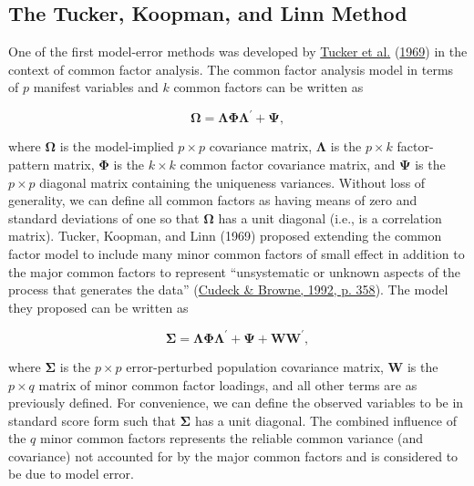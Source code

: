 \documentclass[11pt]{umnthesis}
\begin{document}
\hypertarget{tkl-method}{%
\subsection{The Tucker, Koopman, and Linn Method}\label{tkl-method}}

One of the first model-error methods was developed by \protect\hyperlink{ref-tucker1969}{Tucker et al.} (\protect\hyperlink{ref-tucker1969}{1969}) in the context of common factor analysis. The common factor analysis model in terms of \(p\) manifest variables and \(k\) common factors can be written as

\begin{equation}
\bm{\Omega} = \bm{\Lambda}\bm{\Phi}\bm{\Lambda}^\prime + \bm{\Psi},
\label{eq:cfm}
\end{equation}

\noindent where \(\bm{\Omega}\) is the model-implied \(p \times p\) covariance matrix, \(\bm{\Lambda}\) is the \(p \times k\) factor-pattern matrix, \(\bm{\Phi}\) is the \(k \times k\) common factor covariance matrix, and \(\bm{\Psi}\) is the \(p \times p\) diagonal matrix containing the uniqueness variances. Without loss of generality, we can define all common factors as having means of zero and standard deviations of one so that \(\bm{\Omega}\) has a unit diagonal (i.e., is a correlation matrix). Tucker, Koopman, and Linn (1969) proposed extending the common factor model to include many minor common factors of small effect in addition to the major common factors to represent ``unsystematic or unknown aspects of the process that generates the data'' (\protect\hyperlink{ref-cudeck1992}{Cudeck \& Browne, 1992, p. 358}). The model they proposed can be written as

\begin{equation}
\bm{\Sigma} = \bm{\Lambda}\bm{\Phi}\bm{\Lambda}^\prime + \bm{\Psi} + \mathbf{WW}^\prime,
\label{eq:cfm-tkl}
\end{equation}

\noindent where \(\bm{\Sigma}\) is the \(p \times p\) error-perturbed population covariance matrix, \(\mathbf{W}\) is the \(p \times q\) matrix of minor common factor loadings, and all other terms are as previously defined. For convenience, we can define the observed variables to be in standard score form such that \(\bm{\Sigma}\) has a unit diagonal. The combined influence of the \(q\) minor common factors represents the reliable common variance (and covariance) not accounted for by the major common factors and is considered to be due to model error.
\end{document}
